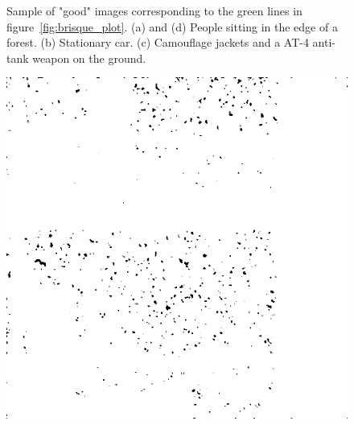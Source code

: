 \begin{figure}[H]
\begin{minipage}[t]{0.245\textwidth}
    \subcaption{}
    \label{fig:good4}
\end{minipage}
    \caption{Sample of "good" images corresponding to the green lines in figure~\ref{fig:brisque_plot}.
    (a) and (d) People sitting in the edge of a forest.  (b) Stationary car. (c) Camouflage jackets and a AT-4 anti-tank weapon on the ground.}
    \label{fig:good}
\end{figure}

\begin{figure}[H]
    \centering
\begin{minipage}[t]{0.245\textwidth}
    \includegraphics[width=1\textwidth]{result/SPC_NRQA/h35_512_m30.PNG}
    \subcaption{}
    \label{fig:half1}
\end{minipage}
\begin{minipage}[t]{0.245\textwidth}

\end{minipage}
\end{figure}
